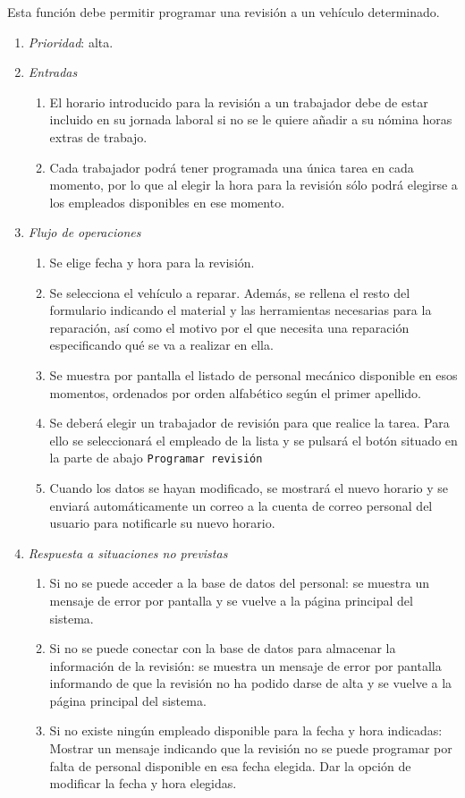 	Esta función debe permitir programar una revisión a un vehículo determinado.

\begin{enumerate}
	\item \textit{Prioridad}: alta.
	\item \textit{Entradas}
	\begin{enumerate}
		\item El horario introducido para la revisión a un trabajador debe de estar incluido en su jornada laboral si no se le quiere añadir a su nómina horas extras de trabajo.
		\item Cada trabajador podrá tener programada una única tarea en cada momento, por lo que al elegir la hora para la revisión sólo podrá elegirse a los empleados disponibles en ese momento.
	\end{enumerate}
	\item \textit{Flujo de operaciones}
	\begin{enumerate}
		\item Se elige fecha y hora para la revisión. 
		\item Se selecciona el vehículo a reparar. Además, se rellena el resto del formulario indicando el material y las herramientas necesarias para la reparación, así como el motivo por el que necesita una reparación especificando qué se va a realizar en ella.
		\item Se muestra por pantalla el listado de personal mecánico disponible en esos momentos, ordenados por orden alfabético según el primer apellido. 
		\item Se deberá elegir un trabajador de revisión para que realice la tarea. Para ello se seleccionará el empleado de la lista y se pulsará el botón situado en la parte de abajo \verb|Programar revisión|
		\item Cuando los datos se hayan modificado, se mostrará el nuevo horario y se enviará automáticamente un correo a la cuenta de correo personal del usuario para notificarle su nuevo horario.
	\end{enumerate}
	\item \textit{Respuesta a situaciones no previstas}
	\begin{enumerate}
		\item Si no se puede acceder a la base de datos del personal: se muestra un mensaje de error por pantalla y se vuelve a la página principal del sistema.
		\item Si no se puede conectar con la base de datos para almacenar la información de la revisión: se muestra un mensaje de error por pantalla informando de que la revisión no ha podido darse de alta y se vuelve a la página principal del sistema.
		\item Si no existe ningún empleado disponible para la fecha y hora indicadas: Mostrar un mensaje indicando que la revisión no se puede programar por falta de personal disponible en esa fecha elegida. Dar la opción de modificar la fecha y hora elegidas.
	\end{enumerate}

\end{enumerate}
